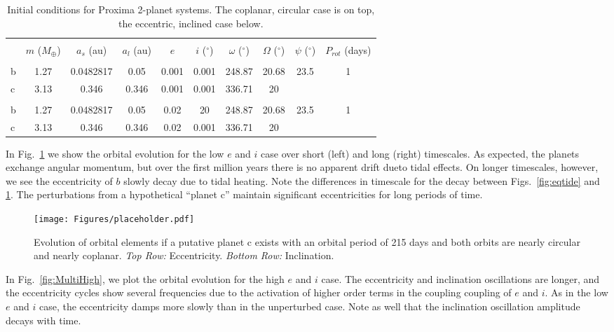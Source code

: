 \documentclass[preprint,12pt]{aastex}
\begin{document}
\begin{table}[h]
\centering
\begin{tabular}{lccccccccc}
\hline\hline \\[-1.5ex]
& $m$ ($M_{\oplus}$)  & $a_s$ (au) & $a_l$ (au) & $e$ & $i$ ($^{\circ}$)
 & $\omega$ ($^{\circ}$) & $\Omega$ ($^{\circ}$) & $\psi$ ($^{\circ}$) & 
 $P_{rot}$ (days)\\[0.5ex]
\hline \\ [-1.5ex]
b & 1.27 & 0.0482817 & 0.05 & 0.001 & 0.001 & 248.87 & 20.68 & 23.5 & 1  \\
c & 3.13 & 0.346 & 0.346 & 0.001 & 0.001 & 336.71 & 20 & &  \\
\hline \\
b & 1.27 & 0.0482817 & 0.05 & 0.02 & 20 & 248.87 & 20.68 & 23.5 & 1  \\
c & 3.13 & 0.346 & 0.346 & 0.02 & 0.001 & 336.71 & 20 & &  \\
\end{tabular}
\caption{Initial conditions for Proxima 2-planet systems. The coplanar, 
  circular case is on top, the eccentric, inclined case below.}
\label{tab:orbitic}
\end{table}

In Fig.~\ref{fig:MultiLow} we show the orbital evolution for the low
$e$ and $i$ case over short (left) and long (right) timescales. As
expected, the planets exchange angular momentum, but over the first
million years there is no apparent drift dueto tidal effects. On
longer timescales, however, we see the eccentricity of $b$ slowly decay
due to tidal heating. Note the differences in timescale for the decay
between Figs.~\ref{fig:eqtide} and \ref{fig:MultiLow}. The
perturbations from a hypothetical ``planet c'' maintain significant
eccentricities for long periods of time.

\begin{figure} 
\begin{center}
\texttt{[image: Figures/placeholder.pdf]}
\end{center}
\caption{Evolution of orbital elements if a putative planet c exists with an 
orbital period of 215 days and both orbits are nearly circular and nearly 
coplanar. {\it Top Row:} Eccentricity. {\it Bottom Row:} Inclination.}
\label{fig:MultiLow}
\end{figure}

In Fig.~\ref{fig:MultiHigh}, we plot the orbital evolution for the
high $e$ and $i$ case. The eccentricity and inclination oscillations
are longer, and the eccentricity cycles show several frequencies due
to the activation of higher order terms in the coupling coupling of $e$ and
$i$. As in the low $e$ and $i$ case, the eccentricity damps more
slowly than in the unperturbed case. Note as well that the inclination
oscillation amplitude decays with time.
\end{document}
